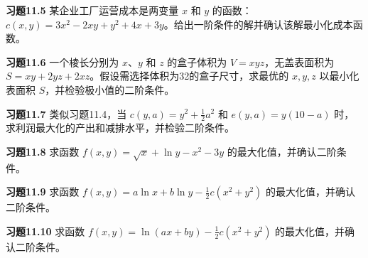 \begin{translation}
\textbf{习题11.5} 某企业工厂运营成本是两变量 $x$ 和 $y$ 的函数：$c(x, y) = 3x^2 - 2xy + y^2 + 4x + 3y$。给出一阶条件的解并确认该解最小化成本函数。

\textbf{习题11.6} 一个棱长分别为 $x$、$y$ 和 $z$ 的盒子体积为 $V = xyz$，无盖表面积为 $S = xy + 2yz + 2xz$。假设需选择体积为32的盒子尺寸，求最优的 $x, y, z$ 以最小化表面积 $S$，并检验极小值的二阶条件。

\setcounter{enumi}{6}
\textbf{习题11.7} 类似习题11.4，当 $c(y, a) = y^2 + \frac{1}{2}a^2$ 和 $e(y, a) = y(10 - a)$ 时，求利润最大化的产出和减排水平，并检验二阶条件。

\textbf{习题11.8} 求函数 $f(x, y) = \sqrt{x} + \ln y - x^2 - 3y$ 的最大化值，并确认二阶条件。

\textbf{习题11.9} 求函数 $f(x, y) = a\ln x + b\ln y - \frac{1}{2}c(x^2 + y^2)$ 的最大化值，并确认二阶条件。

\textbf{习题11.10} 求函数 $f(x, y) = \ln(ax + by) - \frac{1}{2}c(x^2 + y^2)$ 的最大化值，并确认二阶条件。
\end{translation}

